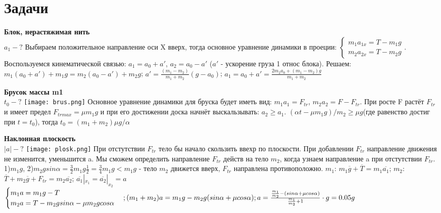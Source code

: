 \documentclass{article}
\begin{document}
\section{Задачи}
\begin{minipage}{.3\textwidth}
\textbf{Блок, нерастяжимая нить}\\
$a_1-?$
Выбираем положительное направление оси X вверх, тогда основное уравнение динамики в проеции:
$
\begin{cases}
    m_1a_{1x}=T-m_1g\\
    m_2a_{2x}=T-m_2g
\end{cases}
$. Воспользуемся кинематической связью: $a_1 =a_0+a'$, $a_2=a_0-a'$ ($a'$ - ускорение груза 1 относ блока). Решаем: $m_1(a_0+a')+m_1g=m_2(a_0-a')+m_2g$; $a'=\frac{(m_1-m_2)}{m_1+m_2}(g-a_0)$; $a_1=a_0+a'=\frac{2m_2a_0+(m_1-m_2)g}{m_1+m_2}$
\end{minipage}
\hfill
\begin{minipage}{.3\textwidth}
\textbf{Брусок массы m1}\\
$t_0-?$
\texttt{[image: brus.png]}
Основное уравнение динамики для бруска будет иметь вид: $m_1a_1=F_{tr}$, $m_2a_2=F-F_{tr}$. При росте F растёт $F_{tr}$ и имеет предел $F_{trmax} = \mu m_1g$ и при его достижении доска начнёт выскальзывать: $a_2\geq a_1$. $(\alpha t -\mu m_1g)/m_2\geq\mu g$(где равенство достиг при $t = t_0$), тогда $t_0=(m_1+m_2)\mu g/\alpha$
\end{minipage}
\hfill
\begin{minipage}{.3\textwidth}
\textbf{Наклонная плоскость}\\
$|a|-?$
\texttt{[image: plosk.png]}
При отстутствии $F_{tr}$ тело бы начало скользить ввехр по плоскости. При добавлении $F_{tr}$ направление движения не изменится, уменьшится a. Мы сможем определить направление $F_{tr}$ действ на тело $m_2$, когда узнаем направление a при отстутствии $F_{tr}$.
1)$m_1g$, 2)$m_2gsin\alpha= \frac{3}{2}m_1g\frac{1}{2}=\frac{3}{4}m_1g<m_1g$ - тело $m_2$ движется вверх, $F_{tr}$ направлена противоположно. 
$m_1$: $m_1\overline{g}+\overline{T}=m_1\overline{a_1}$; $m_2$: $\overline{T}+m_2\overline{g}+F_{tr}=m_2\overline{a_2}$; $\overline{a_1}|_{x_1}=\overline{a_2}|_{x_2}=a$
$
\begin{cases}
    m_1a=m_1g-T\\
    m_2a=T-m_2gsin\alpha-\mu m_2gcos\alpha
\end{cases}\\; (m_1+m_2)a=m_1g-m_2g(sin\alpha+\mu cos\alpha);
a = \frac{\frac{m_1}{m_2}-(sin\alpha+\mu cos\alpha)}{\frac{m_1}{m_2}+1}\cdot g = 0.05g
$
\end{minipage}
\end{document}
